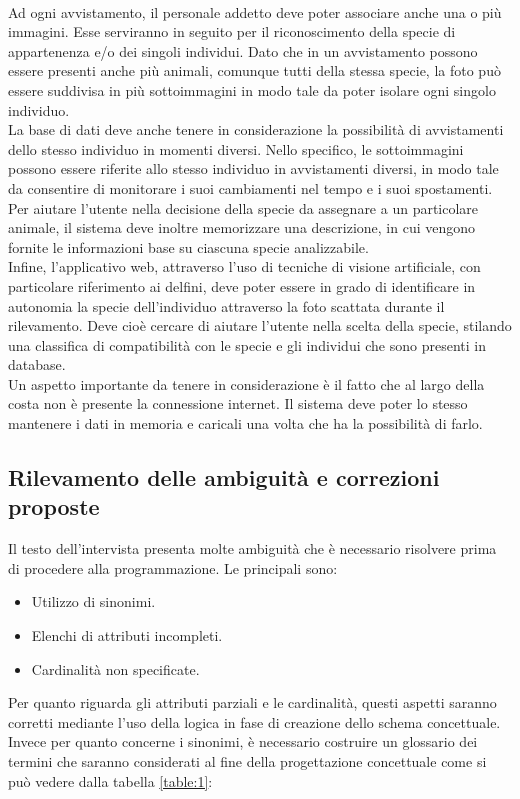 \documentclass[a4paper,final,12pt]{report}
\begin{document}
\\ 
Ad ogni avvistamento, il personale addetto deve poter associare anche una o più immagini. Esse serviranno in seguito per il riconoscimento della specie di appartenenza e/o dei singoli individui. Dato che in un avvistamento possono essere presenti anche più animali, comunque tutti della stessa specie, la foto può essere suddivisa in più sottoimmagini in modo tale da poter isolare ogni singolo individuo.
\\
La base di dati deve anche tenere in considerazione la possibilità di avvistamenti dello stesso individuo in momenti diversi. Nello specifico, le sottoimmagini possono essere riferite allo stesso individuo in avvistamenti diversi, in modo tale da consentire di monitorare i suoi cambiamenti nel tempo e i suoi spostamenti.\\
Per aiutare l'utente nella decisione della specie da assegnare a un particolare animale, il sistema deve inoltre memorizzare una descrizione, in cui vengono fornite le informazioni base su ciascuna specie analizzabile.
\\
Infine, l'applicativo web, attraverso l'uso di tecniche di visione artificiale, con particolare riferimento ai delfini, deve poter essere in grado di identificare in autonomia la specie dell'individuo attraverso la foto scattata durante il rilevamento. Deve cioè cercare di aiutare l'utente nella scelta della specie, stilando una classifica di compatibilità con le specie e gli individui che sono presenti in database.
\\
Un aspetto importante da tenere in considerazione è il fatto che al largo della costa non è presente la connessione internet.  Il sistema deve poter lo stesso mantenere i dati in memoria e caricali una volta che ha la possibilità di farlo.

\subsection{Rilevamento delle ambiguità e correzioni proposte}
Il testo dell'intervista presenta molte ambiguità che è necessario risolvere prima di procedere alla programmazione. Le principali sono:
\begin{itemize}
\item Utilizzo di sinonimi.
\item Elenchi di attributi incompleti.
\item Cardinalità non specificate.
\end{itemize}

Per quanto riguarda gli attributi parziali e le cardinalità, questi aspetti saranno corretti mediante l'uso della logica in fase di creazione dello schema concettuale. Invece per quanto concerne i sinonimi, è necessario costruire un glossario dei termini che saranno considerati al fine della progettazione concettuale come si può vedere dalla tabella \ref{table:1}:
\end{document}
